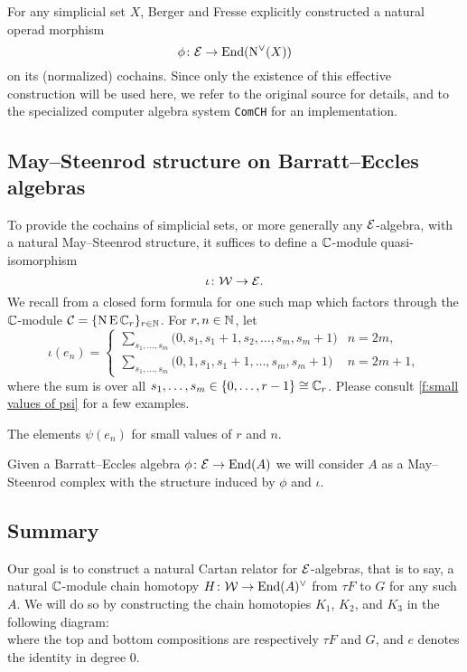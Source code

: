 For any simplicial set $X$, Berger and Fresse explicitly constructed a natural operad morphism
\[
\phi \colon \mathcal{E} \to \mathrm{End}(\operatorname{N^{\vee}}(X))
\]
on its (normalized) cochains.
Since only the existence of this effective construction will be used here, we refer to the original source for details, and to the specialized computer algebra system \texttt{ComCH} for an implementation.

\subsection{May--Steenrod structure on Barratt--Eccles algebras}

To provide the cochains of simplicial sets, or more generally any $\mathcal{E}$-algebra, with a natural May--Steenrod structure, it suffices to define a $\mathbb{C}$-module quasi-isomorphism
\[
\iota \colon \mathcal{W} \to \mathcal{E}.
\]
We recall from \cite{medina2021may_st} a closed form formula for one such map which factors through the $\mathbb{C}$-module $\mathcal{C} = \{\operatorname{N}\operatorname{E}\mathbb{C}_r\}_{r\in\mathbb{N}}$.
For $r,n\in\mathbb{N}$, let
\begin{equation*}
	\iota(e_{n}) =
	\begin{cases}
		\displaystyle{\sum_{s_1, \dots, s_m}} \big(0, {s_1}, {s_1+1}, {s_2}, \dots, {s_{m}}, {s_{m}+1} \big) & n = 2m, \\
		\displaystyle{\sum_{s_1, \dots, s_m}} \big(0, 1, {s_1}, {s_1+1}, \dots, {s_{m}}, {s_{m}+1} \big) & n = 2m+1,
	\end{cases}
\end{equation*}
where the sum is over all $s_1, \dots, s_m \in \{0, \dots, r-1\} \cong \mathbb{C}_r$.
Please consult \cref{f:small values of psi} for a few examples.

\begin{table}
	\centering
	
	\caption{The elements $\psi(e_n)$ for small values of $r$ and $n$.}
	\label{f:small values of psi}
\end{table}

Given a Barratt--Eccles algebra $\phi \colon \mathcal{E} \to \mathrm{End}(A)$ we will consider $A$ as a May--Steenrod complex with the structure induced by $\phi$ and $\iota$.

\subsection{Summary}

Our goal is to construct a natural Cartan relator for $\mathcal{E}$-algebras, that is to say, a natural $\mathbb{C}$-module chain homotopy $H \colon \mathcal{W} \to \mathrm{End}(A)^\vee$ from $\tau F$ to $G$ for any such $A$.
We will do so by constructing the chain homotopies $K_1$, $K_2$, and $K_3$ in the following diagram:
\begin{equation}\label{d:big diagram}
	
\end{equation}
where the top and bottom compositions are respectively $\tau F$ and $G$, and $e$ denotes the identity in degree $0$.

